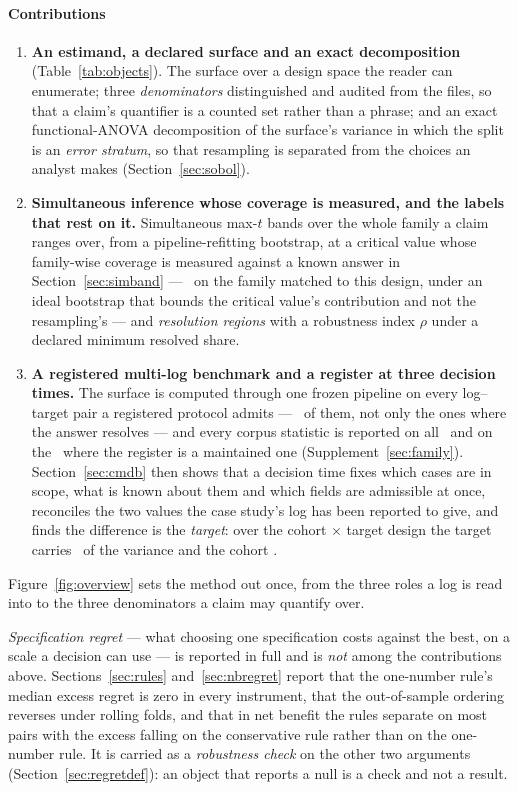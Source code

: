 \documentclass[preprint,12pt,authoryear]{elsarticle}
\theoremstyle{definition}
\begin{document}
\paragraph{Contributions}
\begin{enumerate}
\item \textbf{An estimand, a declared surface and an exact decomposition}
(Table~\ref{tab:objects}). The surface over a design space the reader can
enumerate; three \emph{denominators} distinguished and audited from the files,
so that a claim's quantifier is a counted set rather than a phrase; and an
exact functional-ANOVA decomposition of the surface's variance in which the
split is an \emph{error stratum}, so that resampling is separated from the
choices an analyst makes (Section~\ref{sec:sobol}).
\item \textbf{Simultaneous inference whose coverage is measured, and the
labels that rest on it.} Simultaneous max-$t$ bands over the whole family a
claim ranges over, from a pipeline-refitting bootstrap, at a critical value
whose family-wise coverage is measured against a known answer in
Section~\ref{sec:simband} --- \covEmpHeavyWholeAtDesign\ on the family
matched to this design, under an ideal bootstrap that bounds the critical
value's contribution and not the resampling's --- and \emph{resolution
regions} with a robustness index $\rho$ under a declared minimum resolved
share.
\item \textbf{A registered multi-log benchmark and a register at three
decision times.} The surface is computed through one frozen pipeline on every
log--target pair a registered protocol admits --- \nPairs\ of them, not
only the ones where the answer resolves --- and every corpus statistic is
reported on all \nPairs\ and on the \nItsmPairs\ where the register is a
maintained one (Supplement~\ref{sec:family}). Section~\ref{sec:cmdb} then shows
that a decision time fixes which cases are in scope, what is known about them
and which fields are admissible at once, reconciles the two values the case
study's log has been reported to give, and finds the difference is the
\emph{target}: over the cohort $\times$ target design the target carries
\shareTargetPct\ of the variance and the cohort \shareCohortPct.
\end{enumerate}

\noindent Figure~\ref{fig:overview} sets the method out once, from the three
roles a log is read into to the three denominators a claim may quantify over.

\noindent \emph{Specification regret} --- what choosing one specification
costs against the best, on a scale a decision can use --- is reported in full
and is \emph{not} among the contributions above.
Sections~\ref{sec:rules} and~\ref{sec:nbregret} report that the one-number
rule's median excess regret is zero in every instrument, that the
out-of-sample ordering reverses under rolling folds, and that in net benefit
the rules separate on most pairs with the excess falling on the conservative
rule rather than on the one-number rule. It is carried as a \emph{robustness check} on the other
two arguments (Section~\ref{sec:regretdef}): an object that reports a null is
a check and not a result.
\end{document}
